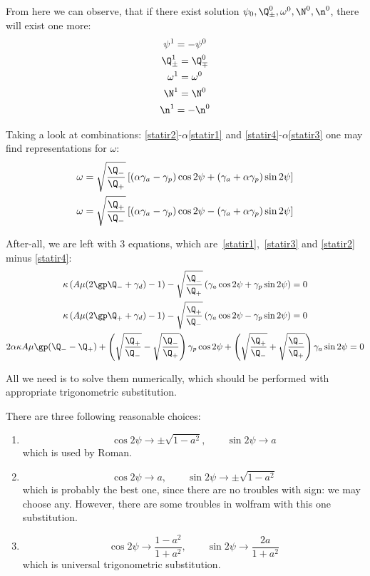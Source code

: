 \documentclass[12pt, notitlepage]{report}
\begin{document}
From here we can observe, that if there exist solution $\psi_0, \Q_\pm^0, \omega^0, \N^0, \n^0$, there will exist one more: 
\begin{gather*}
	\psi^1 = -\psi^0 \\
	\Q_\pm^1 = \Q_\mp^0 \\
	\omega^1 = \omega^0 \\
	\N^1 = \N^0 \\
	\n^1 = -\n^0
\end{gather*}

Taking a look at combinations: \eqref{statir2}-$\alpha$\eqref{statir1} and \eqref{statir4}-$\alpha$\eqref{statir3} one may find representations for $\omega$:
\begin{gather}
	\omega = \sqrt{\frac{\Q_-}{\Q_+}}\left[\left(\alpha\gamma_a-\gamma_p\right)\cos2\psi+\left(\gamma_a+\alpha\gamma_p\right)\sin2\psi\right] \\
	\omega = \sqrt{\frac{\Q_+}{\Q_-}}\left[\left(\alpha\gamma_a-\gamma_p\right)\cos2\psi - \left(\gamma_a+\alpha\gamma_p\right)\sin2\psi\right]
\end{gather} 

After-all, we are left with 3 equations, which are~\eqref{statir1},~\eqref{statir3} and \eqref{statir2} minus \eqref{statir4}:
\begin{gather}
	\kappa\left(A\mu (2\gp\Q_- + \gamma_d) - 1\right) - \sqrt{\frac{\Q_-}{\Q_+}}\left(\gamma_a\cos2\psi + \gamma_p\sin2\psi\right) = 0 \\
	\kappa\left(A\mu (2\gp\Q_+ + \gamma_d) - 1\right) - \sqrt{\frac{\Q_+}{\Q_-}}\left(\gamma_a\cos2\psi - \gamma_p\sin2\psi\right) = 0 \\
	2\alpha\kappa A\mu\gp(\Q_- - \Q_+)  + \left( \sqrt{\frac{\Q_+}{\Q_-}} - \sqrt{\frac{\Q_-}{\Q_+}} \right)\gamma_p\cos2\psi + \left( \sqrt{\frac{\Q_+}{\Q_-}} + \sqrt{\frac{\Q_-}{\Q_+}} \right)\gamma_a\sin2\psi = 0
\end{gather}

All we need is to solve them numerically, which should be performed with appropriate trigonometric substitution.

There are three following reasonable choices:
\begin{enumerate}
	\item $$
	\cos2\psi \rightarrow \pm\sqrt{1-a^2},\qquad \sin2\psi \rightarrow a
	$$
	which is used by Roman.
	\item $$
	\cos2\psi \rightarrow a,\qquad \sin2\psi \rightarrow \pm\sqrt{1-a^2}
	$$
	which is probably the best one, since there are no troubles with sign: we may choose any. However, there are some troubles in wolfram with this one substitution.
	\item
	 $$
	\cos2\psi \rightarrow \frac{1-a^2}{1+a^2},\qquad \sin2\psi \rightarrow \frac{2a}{1+a^2}
	$$ 
	which is universal trigonometric substitution.
\end{enumerate} 
\end{document}
